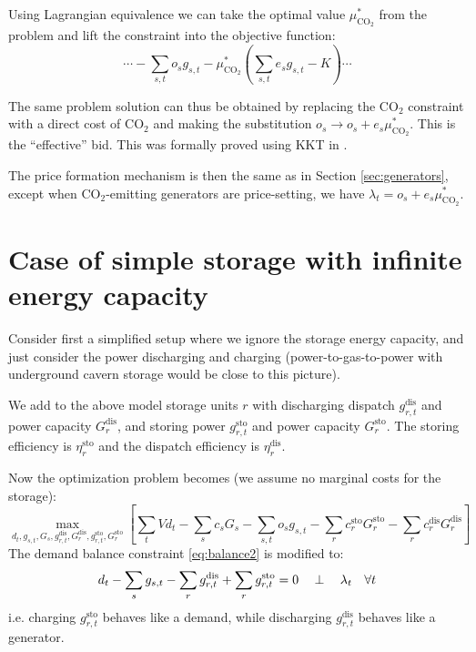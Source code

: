 \documentclass[final,3p]{elsarticle}
\def\l{\lambda} \def\K{\kappa} \def\m{\mu} \def\G{\Gamma} \def\d{\partial}
\begin{document}
Using Lagrangian equivalence we can take the optimal value
$\mu^*_{\textrm{CO}_2}$ from the problem and lift the constraint into the
objective function:
\begin{equation}
  \cdots -\sum_{s,t} o_s g_{s,t}   - \mu^*_{\textrm{CO}_2} \left(\sum_{s,t} e_s g_{s,t} - K \right) \cdots
\end{equation}


The same problem solution can thus be obtained by replacing the CO$_2$
constraint with a direct cost of CO$_2$ and making the substitution $o_s \to o_s
+ e_s \mu^*_{\textrm{CO}_2}$. This is the ``effective'' bid. This was formally
proved using KKT in \cite{Brown2020}.

The price formation mechanism is then the same as in Section
\ref{sec:generators}, except when CO$_2$-emitting generators are price-setting,
we have $\l_t = o_s + e_s \mu^*_{\textrm{CO}_2}$.



\section{Case of simple storage with infinite energy capacity}\label{sec:simple}

Consider first a simplified setup where we ignore the storage energy capacity,
and just consider the power discharging and charging (power-to-gas-to-power with
underground cavern storage would be close to this picture).

We add to the above model storage units $r$ with discharging dispatch
$g^{\textrm{dis}}_{r,t}$ and power capacity $G^{\textrm{dis}}_{r}$, and storing
power $g^{\textrm{sto}}_{r,t}$ and power capacity $G^{\textrm{sto}}_{r}$. The
storing efficiency is $\eta_r^{\textrm{sto}}$ and the dispatch efficiency is
$\eta_r^{\textrm{dis}}$.

Now the optimization problem becomes (we assume no marginal costs for the
storage):
\begin{equation}
  \max_{d_{t}, g_{s,t}, G_s,g^{\textrm{dis}}_{r,t},G^{\textrm{dis}}_{r},g^{\textrm{sto}}_{r,t},G^{\textrm{sto}}_{r}}\left[\sum_{t} Vd_{t} -  \sum_s c_s G_s - \sum_{s,t} o_{s} g_{s,t} -\sum_r c^{\textrm{sto}}_r G^{\textrm{sto}}_r -\sum_r c^{\textrm{dis}}_r G^{\textrm{dis}}_r\right]  \label{eq:objsr}
\end{equation}
The demand balance constraint \eqref{eq:balance2} is modified to:
\begin{align}
  d_{t} - \sum_s g_{s,t} - \sum_r g^{\textrm{dis}}_{r,t} + \sum_r g^{\textrm{sto}}_{r,t}  =  0 \hspace{0.34cm}\perp \hspace{0.34cm} \l_t \hspace{0.34cm} \forall t \label{eq:balance3}
\end{align}
i.e. charging $g^{\textrm{sto}}_{r,t}$ behaves like a demand, while discharging
$g^{\textrm{dis}}_{r,t}$ behaves like a generator.
\end{document}
